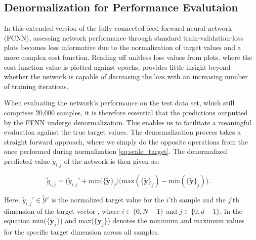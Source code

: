\documentclass[a4paper, UKenglish, 11pt]{uiomaster}
\begin{document}
\subsection{Denormalization for Performance Evalutaion}
In this extended version of the fully connected feed-forward neural network (FCNN), assessing network performance through standard train-validation-loss plots becomes less informative due to the normalization of target values and a more complex cost function. Reading off unitless loss values from plots, where the cost function value is plotted against epochs, provides little insight beyond whether the network is capable of decreasing the loss with an increasing number of training iterations.

When evaluating the network's performance on the test data set, which still comprises 20,000 samples, it is therefore essential that the predictions outputted by the FFNN undergo denormalization. This enables us to facilitate a meaningful evaluation against the true target values. The denormalization process takes a straight forward approach, where we simply do the opposite operations from the once performed during normalization \ref{eq:scale_target}. The denormalized predicted value $\tilde{y}_{i,j}$ of the network is then given as:

\begin{equation}
\tilde{y}_{i,j} = \biggl(\tilde{y}_{i,j}' + \text{min}(\{\tilde{\mathbf{y}}\}_j\biggr) \biggl(\text{max}(\{\tilde{\mathbf{y}}\}_j) - \text{min}(\{\tilde{\mathbf{y}}\}_j)\biggr).
\label{eq:de_scale_target}
\end{equation}

Here, $\tilde{y}_{i,j}' \in \mathcal{\tilde{Y}}'$ is the normalized target value for the $i$'th sample and the $j$'th dimension of the target vector , where $i \in \{0, N-1\}$ and $j \in \{0, d-1\}$. In the equation min($\{\tilde{\mathbf{y}}_j\}$) and max($\{\tilde{\mathbf{y}}_j\}$) denotes the minimum and maximum values for the specific target dimension across all samples.

%
\end{document}
